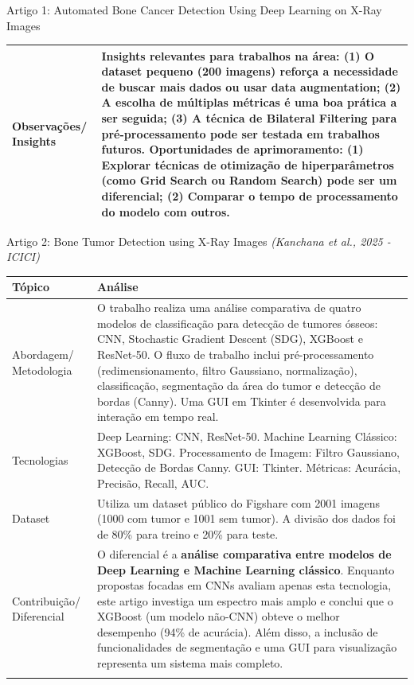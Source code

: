 \documentclass[12pt, a4paper]{article}
\begin{document}
\begin{fichabox}{Artigo 1: Automated Bone Cancer Detection Using Deep Learning on X-Ray Images}
\begin{longtable}{@{} B L{10.5cm} @{}}
    Observações/ Insights & \textbf{Insights relevantes para trabalhos na área:} (1) O dataset pequeno (200 imagens) reforça a necessidade de buscar mais dados ou usar data augmentation; (2) A escolha de múltiplas métricas é uma boa prática a ser seguida; (3) A técnica de Bilateral Filtering para pré-processamento pode ser testada em trabalhos futuros. \textbf{Oportunidades de aprimoramento:} (1) Explorar técnicas de otimização de hiperparâmetros (como Grid Search ou Random Search) pode ser um diferencial; (2) Comparar o tempo de processamento do modelo com outros. \\
    
    \bottomrule
\end{longtable}
\end{fichabox}

\begin{fichabox}{Artigo 2: Bone Tumor Detection using X-Ray Images}
\textit{(Kanchana et al., 2025 - ICICI)}

\begin{longtable}{@{} B L{10.5cm} @{}}
    \toprule
    \textbf{Tópico} & \textbf{Análise} \\
    \midrule
    \endhead
    
    Abordagem/ Metodologia & O trabalho realiza uma análise comparativa de quatro modelos de classificação para detecção de tumores ósseos: CNN, Stochastic Gradient Descent (SDG), XGBoost e ResNet-50. O fluxo de trabalho inclui pré-processamento (redimensionamento, filtro Gaussiano, normalização), classificação, segmentação da área do tumor e detecção de bordas (Canny). Uma GUI em Tkinter é desenvolvida para interação em tempo real. \\
    \addlinespace
    
    Tecnologias & Deep Learning: CNN, ResNet-50. Machine Learning Clássico: XGBoost, SDG. Processamento de Imagem: Filtro Gaussiano, Detecção de Bordas Canny. GUI: Tkinter. Métricas: Acurácia, Precisão, Recall, AUC. \\
    \addlinespace
    
    Dataset & Utiliza um dataset público do Figshare com 2001 imagens (1000 com tumor e 1001 sem tumor). A divisão dos dados foi de 80\% para treino e 20\% para teste. \\
    \addlinespace
    
    Contribuição/ Diferencial & O diferencial é a \textbf{análise comparativa entre modelos de Deep Learning e Machine Learning clássico}. Enquanto propostas focadas em CNNs avaliam apenas esta tecnologia, este artigo investiga um espectro mais amplo e conclui que o XGBoost (um modelo não-CNN) obteve o melhor desempenho (94\% de acurácia). Além disso, a inclusão de funcionalidades de segmentação e uma GUI para visualização representa um sistema mais completo. \\
    \addlinespace
    

\end{longtable}
\end{fichabox}
\end{document}
